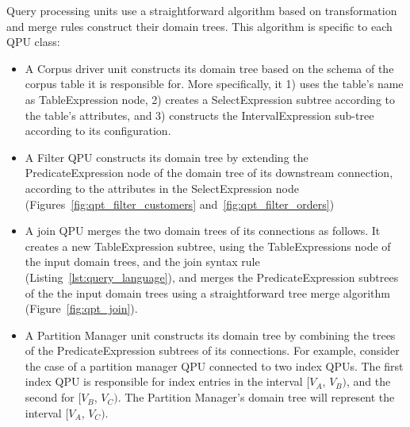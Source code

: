 Query processing units use a straightforward algorithm based on transformation and merge rules construct their domain trees.
This algorithm is specific to each QPU class:
\begin{itemize}
  \item A Corpus driver unit constructs its domain tree based on the schema of the corpus table it is responsible for.
  More specifically,
  it 1) uses the table's name as TableExpression node,
  2) creates a SelectExpression subtree according to the table's attributes,
  and 3) constructs the IntervalExpression sub-tree according to its configuration.

  \item A Filter QPU constructs its domain tree by extending the PredicateExpression node of the domain tree of its
  downstream connection, according to the attributes in the SelectExpression node
  (Figures~\ref{fig:qpt_filter_customers} and~\ref{fig:qpt_filter_orders})

  \item A join QPU merges the two domain trees of its connections as follows.
  It creates a new TableExpression subtree, using the TableExpressions node of the input domain trees, and the
  join syntax rule (Listing~\ref{lst:query_language}),
  and merges the PredicateExpression subtrees of the the input domain trees using a straightforward tree merge algorithm
  (Figure~\ref{fig:qpt_join}).

  \item A Partition Manager unit constructs its domain tree by combining the trees of the PredicateExpression subtrees
  of its connections.
  For example, consider the case of a partition manager QPU connected to two index QPUs.
  The first index QPU is responsible for index entries in the interval $[V_A$, $V_B)$,
  and the second for $[V_B$, $V_C)$.
  The Partition Manager's domain tree will represent the interval $[V_A$, $V_C)$.
\end{itemize}

